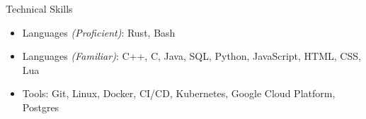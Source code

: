 \documentclass[]{mcdowellcv}
\begin{document}
    \begin{cvsection}{Technical Skills}
        \begin{cvsubsection}{}{}{}  
            \begin{itemize}
                \item Languages \textit{(Proficient)}: Rust, Bash
                \item Languages \textit{(Familiar)}: C++, C, Java, SQL, Python, JavaScript, HTML, CSS, Lua
                \item Tools: Git, Linux, Docker, CI/CD, Kubernetes, Google Cloud Platform, Postgres
            \end{itemize}
        \end{cvsubsection}
    \end{cvsection}
    
\end{document}
